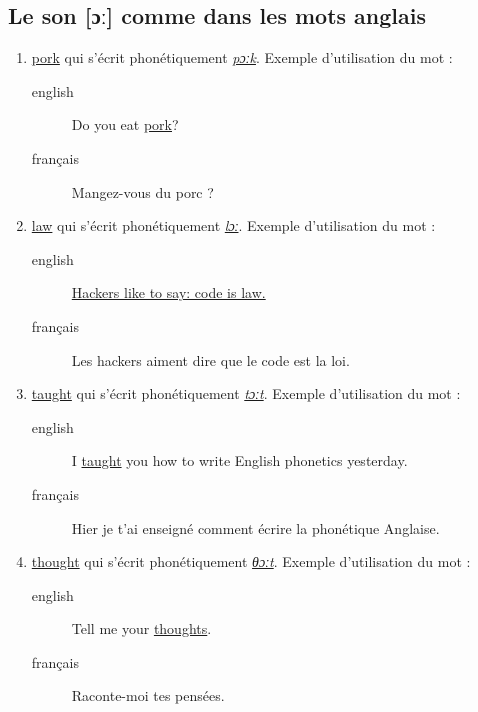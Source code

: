 \subsection{Le son [ɔː] comme dans les mots anglais}
\label{sec:orgab83d97}
\begin{enumerate}
\item \href{http://www.wordreference.com/enfr/pork}{pork} qui s'écrit phonétiquement \href{https://en.oxforddictionaries.com/definition/pork}{\emph{pɔːk}}. Exemple d'utilisation du mot :
\begin{description}
\item[{english}] \textenglish{Do you eat \href{https://youtu.be/WqTJbyfewzw}{pork}?}
\item[{français}] Mangez-vous du porc ?
\end{description}
\item \href{http://www.wordreference.com/enfr/law}{law} qui s'écrit phonétiquement \href{https://en.oxforddictionaries.com/definition/law}{\emph{lɔː}}. Exemple d'utilisation du mot : 
\begin{description}
\item[{english}] \textenglish{\href{https://youtu.be/us5CUAsH0U0}{Hackers like to say: code is law.}}
\item[{français}] Les hackers aiment dire que le code est la loi.
\end{description}
\item \href{http://www.wordreference.com/enfr/taught}{taught} qui s'écrit phonétiquement \href{https://en.oxforddictionaries.com/definition/taught}{\emph{tɔːt}}. Exemple d'utilisation du mot :
\begin{description}
\item[{english}] \textenglish{I \href{https://youtu.be/U2BG2\_K2fGk}{taught} you how to write English phonetics yesterday.}
\item[{français}] Hier je t'ai enseigné comment écrire la phonétique
Anglaise.
\end{description}
\item \href{http://www.wordreference.com/enfr/thought}{thought} qui s'écrit phonétiquement \href{https://en.oxforddictionaries.com/definition/thought}{\emph{θɔːt}}. Exemple d'utilisation du mot : 
\begin{description}
\item[{english}] \textenglish{Tell me your \href{https://youtu.be/8kR-GDbYHhc}{thoughts}.}
\item[{français}] Raconte-moi tes pensées.
\end{description}
\end{enumerate}
